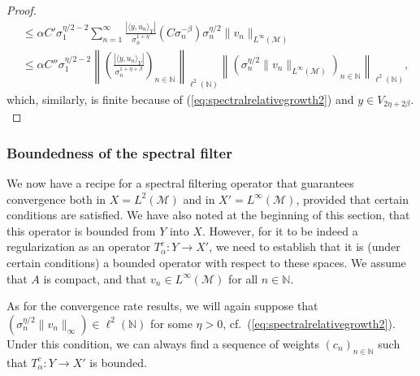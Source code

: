 \documentclass{article}
\theoremstyle{definition}
\newcommand{\N}{\mathbb{N}}
\newcommand{\smallnorm}[1]{\lVert#1\rVert}
\newcommand{\norm}[1]{\left\lVert#1\right\rVert}
\newcommand{\abs}[1]{\left\lvert#1\right\rvert}
\begin{document}
\begin{proof}
\begin{align*}
    & \leq
    \alpha
    C'
    \sigma_1^{\eta/2-2}
    \sum_{n=1}^\infty 
    \frac{ \abs{\langle y, u_n \rangle_Y}}{
    \sigma_n^{1+\eta}}
    (C\sigma_n^{-\beta})
    \sigma_n^{\eta/2}
    \smallnorm{v_n}_{L^\infty(\mathcal{M})}\\
    &\leq
    \alpha
    C''
    \sigma_1^{\eta/2-2}
    \norm{\left(
    \frac{
    \abs{\langle y, u_n \rangle_Y}}{
    \sigma_n^{1+\eta+\beta}}    
    \right)_{n\in\N}}_{\ell^2(\N)}
    \norm{\left(
    \sigma_n^{\eta/2}
    \smallnorm{v_n
    }_{L^\infty(\mathcal{M})}
    \right)_{n\in\N}}_{\ell^2(\N)},
\end{align*}
which, similarly, is finite because of (\ref{eq:spectralrelativegrowth2}) and $y \in V_{2\eta+2\beta}.$
\end{proof}

\subsubsection{Boundedness of the spectral filter}\label{Sec:boundedness}

We now have a recipe for a spectral filtering operator that guarantees convergence both in \(X=L^2(\mathcal{M})\) and in \(X'=L^\infty(\mathcal{M})\),
provided that certain conditions are satisfied. We have also noted at the beginning of this section, that this operator is bounded from $Y$ into $X$. However, for it to be indeed a regularization as an operator $T_\alpha^c: Y \to X'$, we need to establish that it is (under certain conditions) a bounded operator with respect to these spaces. 
We assume that \(A\) is compact, and that \(v_n\in L^\infty(\mathcal{M})\) for all \(n\in\N\).

As for the convergence rate results, we will again suppose that  $(\sigma_n^{\eta/2} \|v_n\|_\infty) \in \ell^2(\mathbb{N})$ for some $\eta>0$, cf.\ (\ref{eq:spectralrelativegrowth2}).
Under this condition, we can always find a sequence of weights
\((c_n)_{n\in\N}\)
such that \(T_\alpha^c: Y \to X'\) is bounded.
\end{document}
